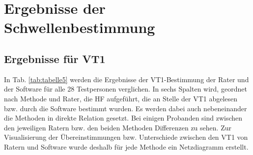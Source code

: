\section{Ergebnisse der Schwellenbestimmung}

\subsection{Ergebnisse für VT1}

In Tab. \ref{tab:tabelle5} werden die Ergebnisse der VT1-Bestimmung der Rater und der Software für alle 28 Testpersonen verglichen. In sechs Spalten wird, geordnet nach Methode und Rater, die \acs{HF} aufgeführt, die an Stelle der VT1 abgelesen bzw. durch die Software bestimmt wurden. Es werden dabei auch nebeneinander die Methoden in direkte Relation gesetzt. Bei einigen Probanden sind zwischen den jeweiligen Ratern bzw. den beiden Methoden Differenzen zu sehen. Zur Visualisierung der Übereinstimmungen bzw. Unterschiede zwischen den VT1 von Ratern und Software wurde deshalb für jede Methode ein Netzdiagramm erstellt.


